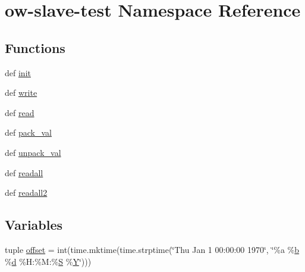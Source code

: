 \hypertarget{namespaceow-slave-test}{\section{ow-\/slave-\/test Namespace Reference}
\label{namespaceow-slave-test}
}
\subsection*{Functions}
\begin{DoxyCompactItemize}
\item 
def \hyperlink{namespaceow-slave-test_ab091aabaec0d431fbd8f2966c4ad2b34}{init}
\item 
def \hyperlink{namespaceow-slave-test_a6208e9fac4a2985c7004148f0c6f3a0b}{write}
\item 
def \hyperlink{namespaceow-slave-test_a91854caa9cb46af512a1868311c2eb26}{read}
\item 
def \hyperlink{namespaceow-slave-test_a64b1d041927699889619c1d9164a23b4}{pack\-\_\-val}
\item 
def \hyperlink{namespaceow-slave-test_ac894ce4758d4c4841f29c609063bf5a2}{unpack\-\_\-val}
\item 
def \hyperlink{namespaceow-slave-test_a84f5a1017b72cca872e223e58758e94f}{readall}
\item 
def \hyperlink{namespaceow-slave-test_a7c6f6e730ee5db6816886742e49355b5}{readall2}
\end{DoxyCompactItemize}
\subsection*{Variables}
\begin{DoxyCompactItemize}
\item 
tuple \hyperlink{namespaceow-slave-test_aabcf0d09fb3ab10a273d0b662db302c3}{offset} = int(time.\-mktime(time.\-strptime(\char`\"{}Thu Jan 1 00\-:00\-:00 1970\char`\"{}, \char`\"{}\%a \%\hyperlink{IMU_8cpp_a20f3a6e8a2ba2537edf801801628417b}{b} \%\hyperlink{OWGeneric__DangerShield_8ino_a22871ee78191bcd7676a38358795104e}{d} \%H\-:\%M\-:\%\hyperlink{md5_8c_a5a9675d71aad8449f8e4112ce611fd93}{S} \%\hyperlink{OWGeneric__SensorStation_8ino_ac915220fb659eb2c5958a1ccd81b80d4}{Y}\char`\"{})))
\end{DoxyCompactItemize}


